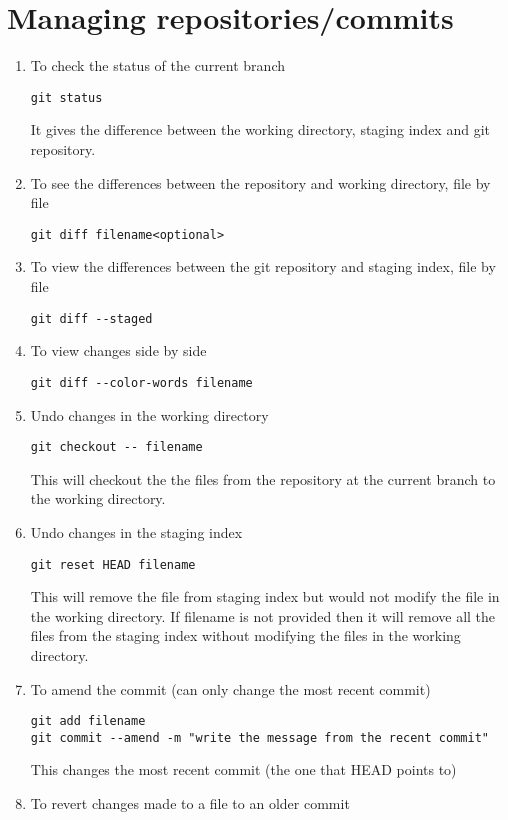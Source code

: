\documentclass[paper=a4, fontsize=12pt]{scrartcl}
\begin{document}
\section*{Managing repositories/commits}
\begin{enumerate}
\item To check the status of the current branch
\begin{lstlisting}
git status
\end{lstlisting}
It gives the difference between the working directory, staging index and git repository.
\item To see the differences between the repository and working directory, file by file
\begin{lstlisting}
git diff filename<optional>
\end{lstlisting}
\item To view the differences between the git repository and staging index, file by file
\begin{lstlisting}
git diff --staged
\end{lstlisting}
\item To view changes side by side
\begin{lstlisting}
git diff --color-words filename
\end{lstlisting}
\item Undo changes in the working directory
\begin{lstlisting}
git checkout -- filename
\end{lstlisting}
This will checkout the the files from the repository at the current branch to the working directory.
\item Undo changes in the staging index
\begin{lstlisting}
git reset HEAD filename
\end{lstlisting}
This will remove the file from staging index but would not modify the file in the working directory. If filename is not provided then it will remove all the files from the staging index without modifying the files in the working directory.
\item To amend the commit (can only change the most recent commit)
\begin{lstlisting}
git add filename
git commit --amend -m "write the message from the recent commit"
\end{lstlisting}
This changes the most recent commit (the one that HEAD points to)
\item To revert changes made to a file to an older commit
\begin{lstlisting}

\end{lstlisting}
\end{enumerate}
\end{document}
